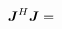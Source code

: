 \documentclass[useAMS,usenatbib]{mn2e}
\newcommand{\mat}[1]{{\bmath{#1}}}
\newcommand{\JJ}{\mat{J}} %
\newcommand{\JHJ}{\JJ^H\JJ} %
\newcommand{\AUGx}[1]{\mathbf{\breve{#1}}}
\newcommand{\RRr}{\AUGx{R}}
\newcommand{\Rop}[1]{\mathcal{R}_{{#1}}}
\newcommand{\Lop}[1]{\mathcal{L}_{{#1}}}
\numberwithin{equation}{section} %
\providecommand{\DIFdelbegin}{} %
\providecommand{\DIFdelend}{} %
\begin{document}
\DIFdelend \begin{equation}
\label{eq:JHJ:pol}
\JHJ = \DIFdelbegin %
\end{equation}%


\end{document}

